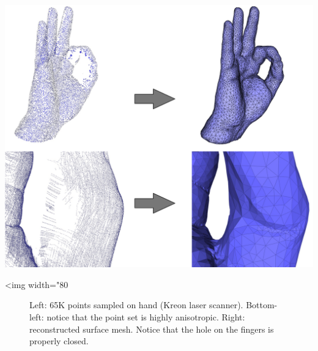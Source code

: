 \begin{center}
    \label{Surface_reconstruction_points_3-fig-holes_good}
    \begin{ccTexOnly}
      \includegraphics[width=1.0\textwidth]{Surface_reconstruction_points_3/holes_good} %
    \end{ccTexOnly}
    \begin{ccHtmlOnly}
        <img width="80%
    \end{ccHtmlOnly}
    \begin{figure}[h]
        \caption{Left: 65K points sampled on hand (Kreon laser scanner).
                 Bottom-left: notice that the point set is highly anisotropic.
                 Right: reconstructed surface mesh. Notice that the hole on the fingers is properly closed.}
    \end{figure}
\end{center}

